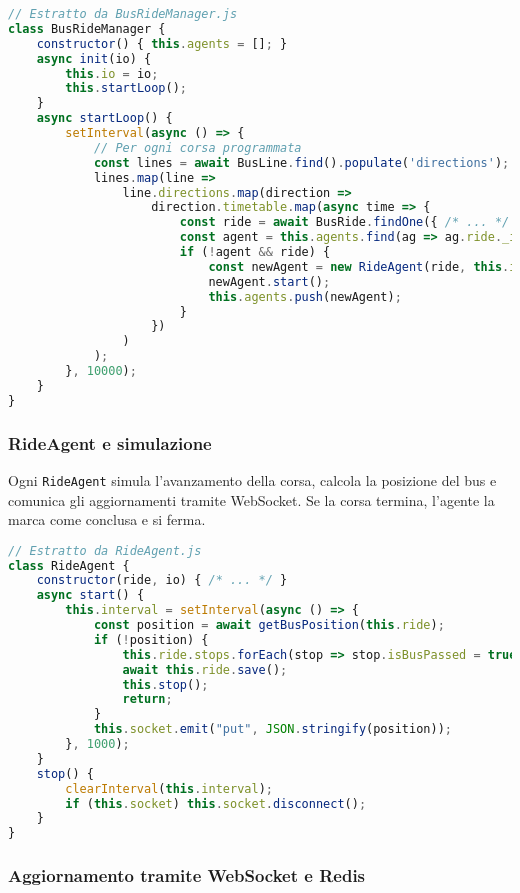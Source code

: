 \begin{lstlisting}[language=JavaScript]
// Estratto da BusRideManager.js
class BusRideManager {
    constructor() { this.agents = []; }
    async init(io) {
        this.io = io;
        this.startLoop();
    }
    async startLoop() {
        setInterval(async () => {
            // Per ogni corsa programmata
            const lines = await BusLine.find().populate('directions');
            lines.map(line =>
                line.directions.map(direction =>
                    direction.timetable.map(async time => {
                        const ride = await BusRide.findOne({ /* ... */ });
                        const agent = this.agents.find(ag => ag.ride._id.toString() == ride._id.toString());
                        if (!agent && ride) {
                            const newAgent = new RideAgent(ride, this.io);
                            newAgent.start();
                            this.agents.push(newAgent);
                        }
                    })
                )
            );
        }, 10000);
    }
}
\end{lstlisting}

\subsubsection{RideAgent e simulazione}

Ogni \texttt{RideAgent} simula l’avanzamento della corsa, calcola la posizione del bus e comunica gli aggiornamenti tramite WebSocket. Se la corsa termina, l’agente la marca come conclusa e si ferma.

\begin{lstlisting}[language=JavaScript]
// Estratto da RideAgent.js
class RideAgent {
    constructor(ride, io) { /* ... */ }
    async start() {
        this.interval = setInterval(async () => {
            const position = await getBusPosition(this.ride);
            if (!position) {
                this.ride.stops.forEach(stop => stop.isBusPassed = true);
                await this.ride.save();
                this.stop();
                return;
            }
            this.socket.emit("put", JSON.stringify(position));
        }, 1000);
    }
    stop() {
        clearInterval(this.interval);
        if (this.socket) this.socket.disconnect();
    }
}
\end{lstlisting}

\subsubsection{Aggiornamento tramite WebSocket e Redis}

